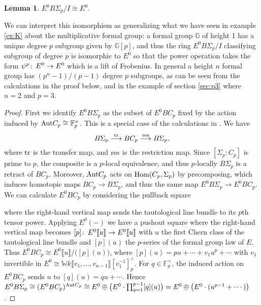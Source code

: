 \documentclass{gtpart}
\newtheorem{lem}[thm]{Lemma}
\theoremstyle{definition}
\theoremstyle{remark}
\def\co{\colon\thinspace}
\newcommand{\mb}[1]{\mathbb{#1}}
\newcommand{\Hom}{\ensuremath{{\rm Hom}}}
\begin{document}
\begin{lem}
$E^0 B\Sigma_p/I \cong E^0$.
\end{lem}
We can interpret this isomorphism as generalizing what we have 
seen in example \ref{ex:K} about the multiplicative formal group: a formal group $\mb G$ of height 1 
has a unique degree $p$ subgroup given by ${\mb G}[p]$, and 
thus the ring $E^0 B\Sigma_p/I$ classifying subgroup of degree 
$p$ is isomorphic to $E^0$ so that the power operation takes 
the form $\psi^p\co E^0 \to E^0$ which is a lift of Frobenius.  
In general a height $n$ formal group has $(p^n-1)/(p-1)$ degree 
$p$ subgroups, as can be seen from the calculations in the proof 
below, and in the example of section \ref{sec:p3} where $n=2$ 
and $p=3$.
\begin{proof}
First we identify $E^0 B\Sigma_p$ as the subset of $E^0 BC_p$ fixed by 
the action induced by ${\rm Aut} C_p \cong {\mb F}_p^\times$. This is 
a special case of the calculations in \cite[section 12]{lpo}.  
We have
\[
 B\Sigma_p \stackrel{\rm tr}{\longrightarrow} BC_p \stackrel{\rm res}{\longrightarrow} B\Sigma_p,
\]
where $\rm tr$ is the transfer map, and $\rm res$ is the restriction 
map.  Since $[\Sigma_p : C_p]$ 
is prime to $p$, the composite is a $p$-local equivalence, and thus 
$p$-locally $B\Sigma_p$ is a retract of $BC_p$.  Moreover, ${\rm Aut} C_p$ 
acts on $\Hom (C_p,\Sigma_p)$ by precomposing, which induces homotopic 
maps $BC_p \to B\Sigma_p$, and thus the same map $E^0 B\Sigma_p \to E^0 BC_p$.  
We can calculate $E^0 BC_p$ by considering the pullback square 
\begin{center}
\end{center}
where the right-hand vertical map sends the tautological line bundle to 
its $p$th tensor power.  Applying $E^0(-)$ we have a pushout square 
where the right-hand vertical map becomes $[p]\co E^0 \llbracket u \rrbracket \to E^0 \llbracket u \rrbracket$ 
with $u$ the first Chern class of the tautological line bundle and $[p](u)$ 
the $p$-series of the formal group law of $E$.  Thus $E^0 BC_p \cong E^0 \llbracket u \rrbracket / \big([p](u)\big)$, 
where $[p](u) = p u + \cdots + v_1 u^p + \cdots$ with $v_1$ invertible in $E^0 \cong {\mb W}k \llbracket v_1,...,v_{n-1} \rrbracket [v_1^{-1}]_p^\wedge$.  
For $q \in {\mb F}_p^\times$, the induced action on $E^0 BC_p$ sends $u$ to $[q](u) = q u + \cdots$.  
Hence $E^0 B\Sigma_p \cong (E^0 BC_p)^{{\rm Aut} C_p} \cong E^0 \oplus \big(E^0 \cdot \prod_{q=1}^{p-1} [q](u)\big) = E^0 \oplus \big(E^0 \cdot (u^{p-1} + \cdots)\big)$.  


\end{proof}
\end{document}
